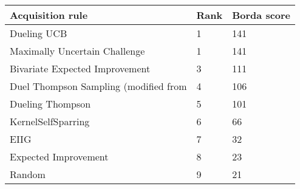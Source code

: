 \begin{tabular}{lll}
Acquisition rule & Rank & Borda score \\ 
\hline 
Dueling UCB \citep{Benavoli2020}                           & 1 & 141 \\ 
Maximally Uncertain Challenge                                 & 1 & 141 \\ 
Bivariate Expected Improvement \citep{Nielsen2015}         & 3 & 111 \\ 
Duel Thompson Sampling (modified from \citet{Gonzalez2017} & 4 & 106 \\ 
Dueling Thompson \citep{Benavoli2020}                      & 5 & 101 \\ 
KernelSelfSparring \citep{Sui2017}                         & 6 & 66 \\ 
EIIG \citep{Benavoli2020}                                  & 7 & 32 \\ 
Expected Improvement \citep{Brochu2010a}                   & 8 & 23 \\ 
Random                                                     & 9 & 21 \\ 
\hline 
\end{tabular}